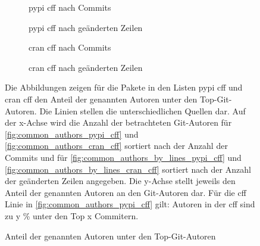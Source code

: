 \begin{figure}
    \begin{subfigure}{.5\textwidth}
        \centering
        
        \caption{\gls{pypi} \gls{cff} nach Commits}
        \label{fig:common_authors_2_pypi_cff}
    \end{subfigure}%
    \begin{subfigure}{.5\textwidth}
        \centering
        
        \caption{\gls{pypi} \gls{cff} nach geänderten Zeilen}
        \label{fig:common_authors_2_by_lines_pypi_cff}
    \end{subfigure}
    \begin{subfigure}{.5\textwidth}
        \centering
        
        \caption{\gls{cran} \gls{cff} nach Commits}
        \label{fig:common_authors_2_cran_cff}
    \end{subfigure}%
    \begin{subfigure}{.5\textwidth}
        \centering
        
        \caption{\gls{cran} \gls{cff} nach geänderten Zeilen}
        \label{fig:common_authors_2_by_lines_cran_cff}
    \end{subfigure}
    \caption{Anteil der genannten Autoren unter den Top-Git-Autoren}
    \label{fig:common_authors_2}
    \small
    Die Abbildungen zeigen für die Pakete in den Listen \gls{pypi} \gls{cff} und \gls{cran} \gls{cff} den Anteil der genannten Autoren unter den Top-Git-Autoren. Die Linien stellen die unterschiedlichen Quellen dar. Auf der x-Achse wird die Anzahl der betrachteten Git-Autoren für \autoref{fig:common_authors_pypi_cff} und \autoref{fig:common_authors_cran_cff} sortiert nach der Anzahl der Commits und für \autoref{fig:common_authors_by_lines_pypi_cff} und \autoref{fig:common_authors_by_lines_cran_cff} sortiert nach der Anzahl der geänderten Zeilen angegeben. Die y-Achse stellt jeweils den Anteil der genannten Autoren an den Git-Autoren dar. Für die \gls{cff} Linie in \autoref{fig:common_authors_pypi_cff} gilt: Autoren in der \gls{cff} sind zu y \% unter den Top x Commitern.
\end{figure}

